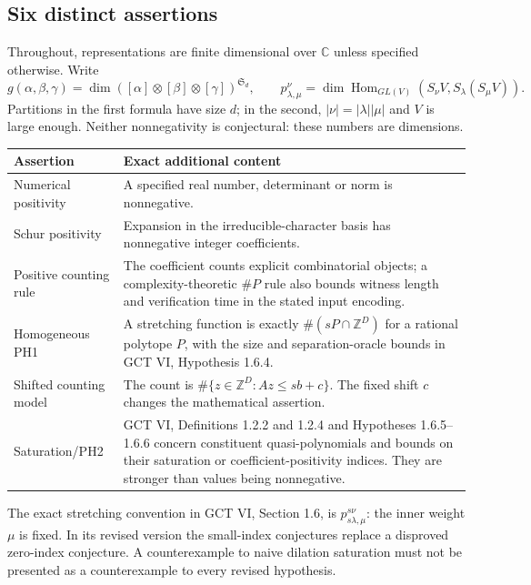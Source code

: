 \documentclass[11pt,a4paper]{article}
\begin{document}
\subsection{Six distinct assertions}
Throughout, representations are finite dimensional over $\mathbb C$ unless
specified otherwise. Write
\[
 g(\alpha,\beta,\gamma)
 =\dim([\alpha]\otimes[\beta]\otimes[\gamma])^{\mathfrak S_d},
 \qquad
 p_{\lambda,\mu}^{\nu}
 =\dim\operatorname{Hom}_{GL(V)}
     (S_\nu V,S_\lambda(S_\mu V)).
\]
Partitions in the first formula have size $d$; in the second,
$|\nu|=|\lambda||\mu|$ and $V$ is large enough. Neither nonnegativity is
conjectural: these numbers are dimensions.

\begin{center}\small
\begin{tabularx}{\linewidth}{@{}p{.18\linewidth}X@{}}
\toprule
Assertion & Exact additional content\\
\midrule
Numerical positivity & A specified real number, determinant or norm is nonnegative.\\
Schur positivity & Expansion in the irreducible-character basis has
nonnegative integer coefficients.\\
Positive counting rule & The coefficient counts explicit combinatorial
objects; a complexity-theoretic $\#P$ rule also bounds witness length and
verification time in the stated input encoding.\\
Homogeneous PH1 & A stretching function is exactly
$\#(sP\cap\mathbb Z^D)$ for a rational polytope $P$, with the size and
separation-oracle bounds in GCT VI, Hypothesis 1.6.4.\\
Shifted counting model & The count is $\#\{z\in\mathbb Z^D:Az\le sb+c\}$.
The fixed shift $c$ changes the mathematical assertion.\\
Saturation/PH2 & GCT VI, Definitions 1.2.2 and 1.2.4 and
Hypotheses 1.6.5--1.6.6 concern constituent quasi-polynomials and bounds
on their saturation or coefficient-positivity indices. They are stronger
than values being nonnegative.\\
\bottomrule
\end{tabularx}
\end{center}

The exact stretching convention in GCT VI, Section 1.6, is
$p_{s\lambda,\mu}^{s\nu}$: the inner weight $\mu$ is fixed.
In its revised version the small-index conjectures replace a disproved
zero-index conjecture. A counterexample to naive dilation saturation must
not be presented as a counterexample to every revised hypothesis.
\end{document}
